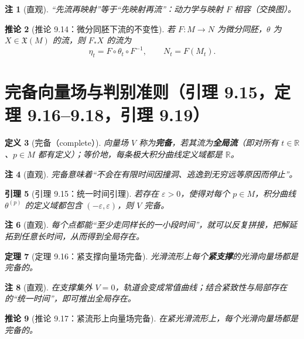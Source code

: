 \documentclass[11pt]{article}
\newtheorem{definition}{定义}[section]
\newtheorem{theorem}[definition]{定理}
\newtheorem{lemma}[definition]{引理}
\newtheorem{corollary}[definition]{推论}
\newtheorem{remark}[definition]{注}
\newcommand{\R}{\mathbb{R}}
\newcommand{\X}{\mathfrak{X}}
\begin{document}
\begin{remark}[直观]
“先流再映射”等于“先映射再流”：动力学与映射 $F$ 相容（交换图）。
\end{remark}

\begin{corollary}[推论 9.14：微分同胚下流的不变性]
若 $F:M\to N$ 为微分同胚，$\theta$ 为 $X\in\X(M)$ 的流，则 $F_*X$ 的流为
\[
\eta_t=F\circ \theta_t\circ F^{-1},\qquad N_t=F(M_t).
\]
\end{corollary}

\section{完备向量场与判别准则（引理 9.15，定理 9.16--9.18，引理 9.19）}

\begin{definition}[完备（complete）]
向量场 $V$ 称为\textbf{完备}，若其流为\textbf{全局流}（即对所有 $t\in\R$、$p\in M$ 都有定义）；等价地，每条极大积分曲线定义域都是 $\R$。
\end{definition}

\begin{remark}[直观]
完备意味着“不会在有限时间因撞洞、逃逸到无穷远等原因而停止”。
\end{remark}

\begin{lemma}[引理 9.15：统一时间引理]
若存在 $\varepsilon>0$，使得对每个 $p\in M$，积分曲线 $\theta^{(p)}$ 的定义域都包含 $(-\varepsilon,\varepsilon)$，则 $V$ 完备。
\end{lemma}

\begin{remark}[直观]
每个点都能“至少走同样长的一小段时间”，就可以反复拼接，把解延拓到任意长时间，从而得到全局存在。
\end{remark}

\begin{theorem}[定理 9.16：紧支撑向量场完备]
光滑流形上每个\textbf{紧支撑}的光滑向量场都是完备的。
\end{theorem}

\begin{remark}[直观]
在支撑集外 $V=0$，轨道会变成常值曲线；结合紧致性与局部存在的“统一时间”，即可推出全局存在。
\end{remark}

\begin{corollary}[推论 9.17：紧流形上向量场完备]
在紧光滑流形上，每个光滑向量场都是完备的。
\end{corollary}
\end{document}
